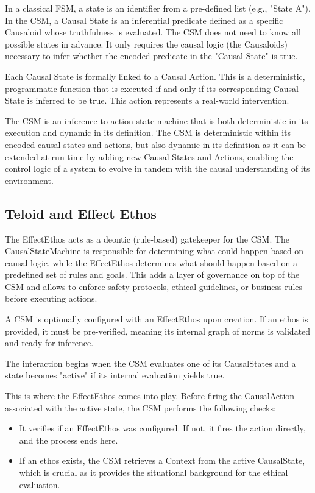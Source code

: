 In a classical FSM, a state is an identifier from a pre-defined list (e.g., "State A").
In the CSM, a Causal State is an inferential predicate defined as a specific Causaloid whose truthfulness is evaluated. The CSM does not need to know all possible states in advance. It only requires the causal logic (the Causaloids) necessary to infer whether the encoded predicate in the "Causal State" is true. 

Each Causal State is formally linked to a Causal Action. This is a deterministic, programmatic function that is executed if and only if its corresponding Causal State is inferred to be true. This action represents a real-world intervention.

The CSM is an inference-to-action state machine that is both deterministic in its execution and dynamic in its definition. The CSM is deterministic within its encoded causal states and actions, but also dynamic in its definition as it can be extended at run-time by adding new Causal States and Actions, enabling the control logic of a system to evolve in tandem with the causal understanding of its environment. 

%
%
\subsection{Teloid and Effect Ethos}
\label{sec:epp_effect_ethos}

The EffectEthos acts as a deontic (rule-based) gatekeeper for the CSM. The CausalStateMachine is responsible for determining what could happen based on causal logic, while the EffectEthos determines what should happen based on a predefined set of rules and goals. This adds a layer of governance on top of the CSM and allows to enforce safety protocols, ethical guidelines, or business rules before executing actions.
 
A CSM is optionally configured with an EffectEthos upon creation. If an ethos is provided, it must be pre-verified, meaning its internal graph of norms is validated and ready for inference.

The interaction begins when the CSM evaluates one of its CausalStates and a state becomes "active" if its internal evaluation yields true.

This is where the EffectEthos comes into play. Before firing the CausalAction associated with the active state, the CSM performs the following checks:

\begin{itemize}
	\item It verifies if an EffectEthos was configured. If not, it fires the action directly, and the process ends here.
	\item If an ethos exists, the CSM retrieves a Context from the active CausalState, which is crucial as it provides the situational background for the ethical evaluation.
\end{itemize}

